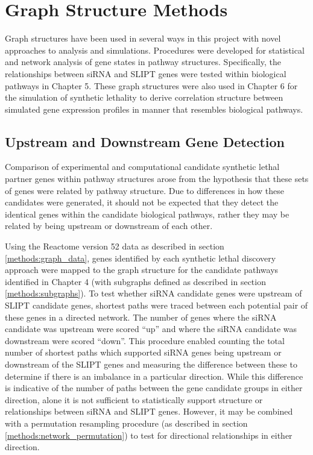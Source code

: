 \section{Graph Structure Methods}
Graph structures have been used in several ways in this project with novel approaches to analysis and simulations. Procedures were developed for statistical and network analysis of gene states in pathway structures. Specifically, the relationships between siRNA and SLIPT genes were tested within biological pathways in Chapter 5. These graph structures were also used in Chapter 6 for the simulation of synthetic lethality to derive correlation structure between simulated gene expression profiles in manner that resembles biological pathways.


\subsection{Upstream and Downstream Gene Detection} \label{methods:pathway_str} 
Comparison of experimental and computational candidate synthetic lethal partner genes within pathway structures arose from the hypothesis that these sets of genes were related by pathway structure. Due to differences in how these candidates were generated, it should not be expected that they detect the identical genes within the candidate biological pathways, rather they may be related by being upstream or downstream of each other. 

Using the Reactome version 52 data \citep{Reactome} as described in section \ref{methods:graph_data}, genes identified by each synthetic lethal discovery approach were mapped to the graph structure for the candidate pathways identified in Chapter 4 (with subgraphs defined as described in section \ref{methods:subgraphs}). To test whether siRNA candidate genes were upstream of SLIPT candidate genes, shortest paths were traced between each potential pair of these genes in a directed network. The number of genes where the siRNA candidate was upstream were scored ``up'' and where the siRNA candidate was downstream were scored ``down''.  This procedure enabled counting the total number of shortest paths which supported siRNA genes being upstream or downstream of the SLIPT genes and measuring the difference between these to determine if there is an imbalance in a particular direction. While this difference is indicative of the number of paths between the gene candidate groups in either direction, alone it is not sufficient to statistically support structure or relationships between siRNA and SLIPT genes. However, it may be combined with a permutation resampling procedure (as described in section \ref{methods:network_permutation}) to test for directional relationships in either direction.

